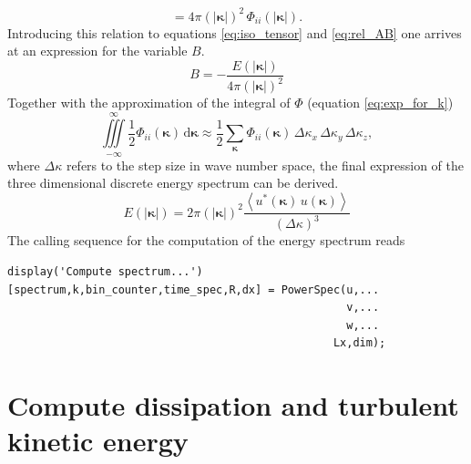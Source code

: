 \documentclass[preprint,12pt,ntfdMod]{elsarticle}
\begin{document}
\begin{par}
\begin{equation}
      =4\pi(|\boldsymbol\kappa|)^2\,\Phi_{ii}(|\boldsymbol\kappa|).
  \end{equation}
Introducing this relation to equations \eqref{eq:iso_tensor} and
\eqref{eq:rel_AB} one arrives at an expression for the variable $B$.
  \begin{equation}
      B=-\frac{E(|\boldsymbol\kappa|)}{4\pi(|\boldsymbol\kappa|)^2}
  \end{equation}
Together with the approximation of the integral of $\Phi$
(equation \eqref{eq:exp_for_k})
  \begin{equation}
      \label{eq:Phi_approx}
      \iiint\limits_{-\infty}^{\infty}\frac{1}{2}\Phi_{ii}(\boldsymbol\kappa)\,\mathrm{d}\boldsymbol\kappa
      \approx\frac{1}{2}\sum\limits_{\boldsymbol\kappa}\Phi_{ii}(\boldsymbol\kappa)
      \,\Delta\kappa_x\,\Delta\kappa_y\,\Delta\kappa_z,
  \end{equation}
where $\Delta\kappa$ refers to the step size in wave number space,
the final expression of the three dimensional discrete energy spectrum can be derived.
  \begin{equation}
      E(|\boldsymbol\kappa|)=2\pi(|\boldsymbol\kappa|)^2\frac{\left<u^{*}
      (\boldsymbol\kappa)\,u(\boldsymbol\kappa)\right>}{(\Delta\kappa)^3}
  \end{equation}
The calling sequence for the computation of the energy spectrum reads

\end{par} \vspace{1em}
\begin{verbatim}
display('Compute spectrum...')
[spectrum,k,bin_counter,time_spec,R,dx] = PowerSpec(u,...
                                                    v,...
                                                    w,...
                                                  Lx,dim);
\end{verbatim}
\begin{par}



\end{par} \vspace{1em}


\section{Compute dissipation and turbulent kinetic energy}
\end{document}
